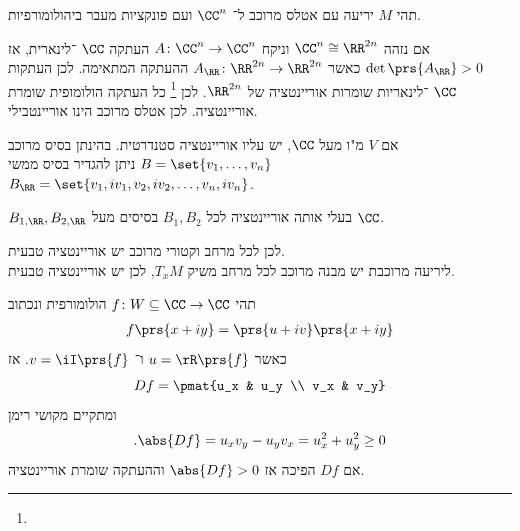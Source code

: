\documentclass[a4paper,10pt,twoside,openany]{book}
\begin{document}
\begin{example}
תהי
$M$
יריעה עם אטלס מרוכב ל־%
$\CC^n$
ועם פונקציות מעבר ביהולומורפיות.
\begin{exercise}
אם נזהה
$\CC^n \cong \RR^{2n}$
וניקח
$A \colon \CC^n \to \CC^n$
העתקה
$\CC$%
־לינארית, אז
$\det\prs{A_{\RR}} > 0$
כאשר
$A_{\RR} \colon \RR^{2n} \to \RR^{2n}$
ההעתקה המתאימה.
לכן העתקות
$\CC$%
־לינאריות שומרות אוריינטציה של
$\RR^{2n}$.
לכן%
\footnote{}
 כל העתקה הולומופית שומרת אוריינטציה.
לכן אטלס מרוכב הינו אוריינטבילי.
\end{exercise}
\end{example}
\begin{example}
אם
$V$
מ"ו מעל
$\CC$,
יש עליו אוריינטציה סטנדרטית.
בהינתן בסיס מרוכב
$B = \set{v_1, \ldots, v_n}$
ניתן להגדיר בסיס ממשי
$B_{\RR} = \set{v_1, iv_1, v_2, iv_2, \ldots, v_n, iv_n}$.
\begin{exercise}
$B_{1, \RR}, B_{2,\RR}$
בעלי אותה אוריינטציה לכל
$B_1, B_2$
בסיסים מעל
$\CC$.
\end{exercise}
לכן לכל מרחב וקטורי מרוכב יש אוריינטציה טבעית.
\\
ליריעה מרוכבת יש מבנה מרוכב לכל מרחב משיק
$T_x M$,
לכן יש אוריינטציה טבעית.
\end{example}
\begin{example}
תהי
$f \colon W \subseteq \CC \to \CC$
הולומורפית ונכתוב
\begin{align*}
f\prs{x+iy} = \prs{u+iv}\prs{x+iy}
\end{align*}
כאשר
$u = \rR\prs{f}$
ו־%
$v = \iI\prs{f}$.
אז
\[Df = \pmat{u_x & u_y \\ v_x & v_y}\]
ומתקיים
מקושי רימן
\[\text{.} \abs{Df} = u_x v_y - u_y v_x = u_x^2 + u_y^2 \geq 0\]
אם
$Df$
הפיכה אז
$\abs{Df} > 0$
וההעתקה שומרת אוריינטציה.
\end{example}
\end{document}
